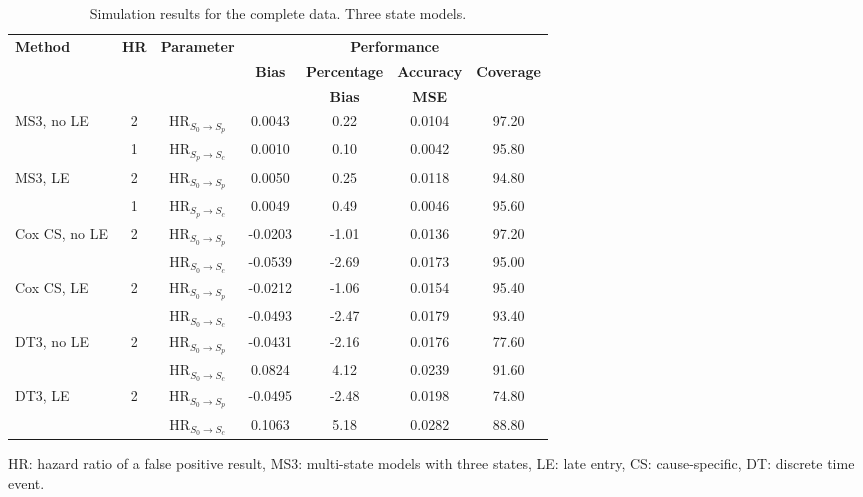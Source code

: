\documentclass{bmcart}
\begin{document}
\begin{backmatter}
\begin{table}[!ht]
  \caption{Simulation results for the complete data. Three state models.}
  \begin{threeparttable}
    \begin{tabular}{l|c|c|c|c|c|c}
    \toprule
    \textbf{Method} & \textbf{HR} & \textbf{Parameter} &\multicolumn{4}{c}{\textbf{Performance}\tnote{a,b}} \\ \cline{4-7}
    & & & \textbf{Bias} & \textbf{Percentage} & \textbf{Accuracy}  &  \textbf{Coverage}  \\
    & & & & \textbf{Bias} &   \textbf{MSE}\\
    \midrule
    \multirow{2}{*}{\parbox{0.2\textwidth}{MS3, no LE}} & 2 & HR$_{S_0 \rightarrow S_p}$ &0.0043&	0.22& 0.0104	& 97.20\\
    & 1 & HR$_{S_p \rightarrow S_c}$ & 0.0010	& 0.10	& 0.0042	&95.80\\
    \cmidrule{1-7}
    \multirow{2}{*}{\parbox{0.2\textwidth}{MS3, LE}} & 2 & HR$_{S_0 \rightarrow S_p}$ &0.0050&	0.25	&0.0118&	94.80\\
    & 1 & HR$_{S_p \rightarrow S_c}$ & 0.0049&	0.49&	0.0046 & 95.60\\
    \midrule
    \multirow{2}{*}{\parbox{0.2\textwidth}{Cox CS, no LE}} & \multirow{2}{*}{2} & HR$_{S_0 \rightarrow S_p}$ &-0.0203&-1.01&0.0136&	97.20\\
    && HR$_{S_0 \rightarrow S_c}$ &-0.0539&-2.69&0.0173&95.00\\
    \cmidrule{1-7}
    \multirow{2}{*}{\parbox{0.2\textwidth}{Cox CS, LE}} & \multirow{2}{*}{2} & HR$_{S_0 \rightarrow S_p}$ &-0.0212&-1.06&	0.0154&	95.40\\
    && HR$_{S_0 \rightarrow S_c}$ & -0.0493&-2.47&0.0179&93.40\\
    \midrule
    \multirow{2}{*}{\parbox{0.2\textwidth}{DT3, no LE}} & \multirow{2}{*}{2} & HR$_{S_0 \rightarrow S_p}$ &-0.0431&	-2.16&	0.0176&	77.60\\
    && HR$_{S_0 \rightarrow S_c}$ &0.0824&	4.12	&0.0239 & 91.60\\
    \cmidrule{1-7}
    \multirow{2}{*}{\parbox{0.2\textwidth}{DT3, LE}} & \multirow{2}{*}{2} & HR$_{S_0 \rightarrow S_p}$ &-0.0495&	-2.48&	0.0198&	74.80\\
    && HR$_{S_0 \rightarrow S_c}$ &0.1063& 5.18&0.0282&	88.80\\
    \bottomrule
    \end{tabular}
    \begin{tablenotes}\scriptsize
      \item HR: hazard ratio of a false positive result, MS3: multi-state models with three states, LE: late entry, CS: cause-specific, DT: discrete time event.

\end{tablenotes}
\end{threeparttable}
\end{table}
\end{backmatter}
\end{document}
